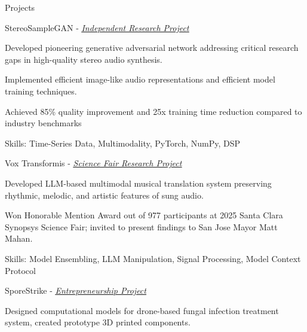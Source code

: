 \documentclass[
  10pt, %
]{resume}
\begin{document}
\begin{rSection}{Projects}

  
    \begin{rSubsection}{StereoSampleGAN - \textit{\underline{\href{https://github.com/shuklabhay/stereo-sample-gan}{Independent Research Project}}}}{}{}{}
        
      \item Developed pioneering generative adversarial network addressing critical research gaps in high-quality stereo audio synthesis.
          
      \item Implemented efficient image-like audio representations and efficient model training techniques.
          
      \item Achieved 85\% quality improvement and 25x training time reduction compared to industry benchmarks
          
      \item Skills: Time-Series Data, Multimodality, PyTorch, NumPy, DSP
          
    \end{rSubsection}
        
    \begin{rSubsection}{Vox Transformis - \textit{\underline{\href{https://shuklabhay.github.io/static/projects/vox-transformis/vt_poster.png}{Science Fair Research Project}}}}{}{}{}
        
      \item Developed LLM-based multimodal musical translation system preserving rhythmic, melodic, and artistic features of sung audio.
          
      \item Won Honorable Mention Award out of 977 participants at 2025 Santa Clara Synopsys Science Fair; invited to present findings to San Jose Mayor Matt Mahan.
          
      \item Skills: Model Ensembling, LLM Manipulation, Signal Processing, Model Context Protocol
          
    \end{rSubsection}
        
    \begin{rSubsection}{SporeStrike - \textit{\underline{\href{https://shuklabhay.github.io/static/projects/sporestrike/FlexFactor_SporeStrike_pitch.pdf}{Entrepreneurship Project}}}}{}{}{}
        
      \item Designed computational models for drone-based fungal infection treatment system, created prototype 3D printed components.
          

\end{rSubsection}
\end{rSection}
\end{document}
